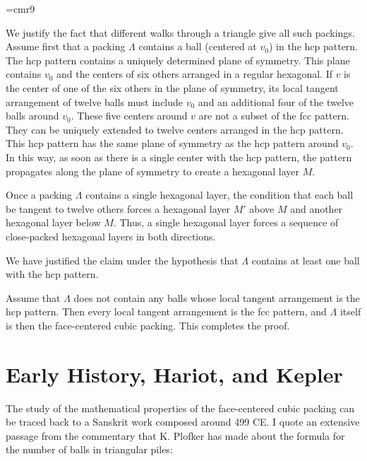 {

\narrower

\font\ninerm=cmr9 \ninerm

\def\=#1{\accent"16 #1}


We justify the fact that different walks through a triangle give all
such packings. Assume first that a packing $\Lambda$ contains a ball
(centered at $v_0$) in the hcp pattern. The hcp pattern contains a
uniquely determined plane of symmetry. This plane contains $v_0$ and
the centers of six others arranged in a regular hexagonal. If $v$ is
the center of one of the six others in the plane of symmetry, its
local tangent arrangement of twelve balls must include $v_0$ and an
additional four of the twelve balls around $v_0$. These five centers
around $v$ are not a subset of the fcc pattern. They can be uniquely
extended to twelve centers arranged in the hcp pattern. This hcp
pattern has the same plane of symmetry as the hcp pattern around
$v_0$. In this way, as soon as there is a single center with the hcp
pattern, the pattern propagates along the plane of symmetry to
create a hexagonal layer $M$.

Once a packing $\Lambda$ contains a single hexagonal layer, the
condition that each ball be tangent to twelve others forces a
hexagonal layer $M'$ above $M$ and another hexagonal layer below
$M$.  Thus, a single hexagonal layer forces a sequence of
close-packed hexagonal layers in both directions.

We have justified the claim under the hypothesis that $\Lambda$
contains at least one ball with the hcp pattern.

Assume that $\Lambda$ does not contain any balls whose local
tangent arrangement is the hcp pattern.  Then every local tangent
arrangement is the fcc pattern, and $\Lambda$ itself is then the
face-centered cubic packing.  This completes the proof.


}

\section{Early History, Hariot, and Kepler}
\label{sec:early}

The study of the mathematical properties of the face-centered cubic
packing can be traced back to a Sanskrit work composed around 499 CE.
I quote an extensive passage from the commentary that K. Plofker
has made about the formula
for the number of balls in triangular piles\cite{Plo00}:
\medskip

